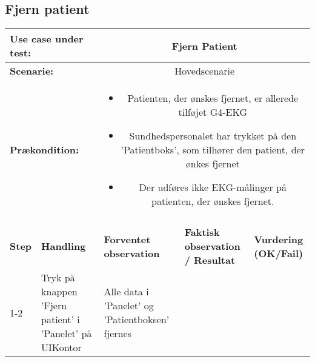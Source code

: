 \subsection{Fjern patient}
\begin{tabular}{|p{1cm}|p{3cm}|p{4cm}|p{4cm}|p{2cm}|}
\hline
\multicolumn{2}{|p{4cm}|}{\textbf{Use case under test:}} & \multicolumn{3}{c|}{Fjern Patient} \\\hline

\multicolumn{2}{|p{3cm}|}{\textbf{Scenarie:}} & \multicolumn{3}{c|}{Hovedscenarie} \\\hline

\multicolumn{2}{|p{3cm}|}{\textbf{Prækondition:}}  & \multicolumn{3}{c|}{\parbox{0.8\textwidth}{
\begin{itemize}[label=$\circ$]
\item Patienten, der ønskes fjernet, er allerede tilføjet G4-EKG
\item Sundhedspersonalet har trykket på den 'Patientboks', som tilhører den patient, der ønkes fjernet
\item Der udføres ikke EKG-målinger på patienten, der ønskes fjernet.  
\end{itemize} }}\\\hline

\multicolumn{5}{|c|}{} \\\hline

\textbf{Step} & \textbf{Handling} & \textbf{Forventet observation} & \textbf{Faktisk observation / Resultat} & \textbf{Vurdering (OK/Fail)}\\\hline

1-2 & Tryk på knappen 'Fjern patient' i 'Panelet' på UIKontor & Alle data i 'Panelet' og 'Patientboksen' fjernes & & \\\hline

\end{tabular}
\\





